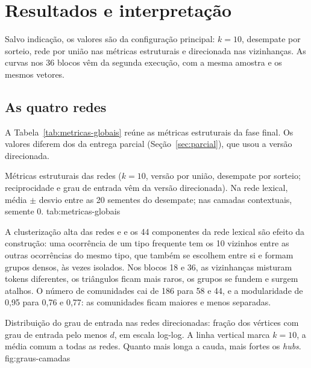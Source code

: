 \section{Resultados e interpretação}\label{sec:resultados}

Salvo indicação, os valores são da configuração principal: $k=10$, desempate por sorteio,
rede por união nas métricas estruturais e direcionada nas vizinhanças. As curvas nos 36 blocos
vêm da segunda execução, com a mesma amostra e os mesmos vetores.

\subsection{As quatro redes}\label{sec:res-geral}

A Tabela~\ref{tab:metricas-globais} reúne as métricas estruturais da fase final. Os valores
diferem dos da entrega parcial (Seção~\ref{sec:parcial}), que usou a versão direcionada.

    {Métricas estruturais das redes ($k=10$, versão por união, desempate por sorteio;
    reciprocidade e grau de entrada vêm da versão direcionada). Na rede lexical, média $\pm$
    desvio entre as 20 sementes do desempate; nas camadas contextuais, semente 0.}
    {tab:metricas-globais}

A clusterização alta das redes  e  e os 44 componentes da rede lexical são
efeito da construção: uma ocorrência de um tipo frequente tem os 10 vizinhos entre as outras
ocorrências do mesmo tipo, que também se escolhem entre si e formam grupos densos, às vezes
isolados. Nos blocos 18 e 36, as vizinhanças misturam tokens diferentes, os triângulos ficam mais raros,
os grupos se fundem e surgem atalhos. O número de comunidades cai de 186 para 58 e 44, e a
modularidade de 0,95 para 0,76 e 0,77: as comunidades ficam maiores e menos separadas.

    {Distribuição do grau de entrada nas redes direcionadas: fração dos vértices com grau de
    entrada pelo menos $d$, em escala log-log. A linha vertical marca $k=10$, a média comum a
    todas as redes. Quanto mais longa a cauda, mais fortes os \emph{hubs}.}
    {fig:graus-camadas}

